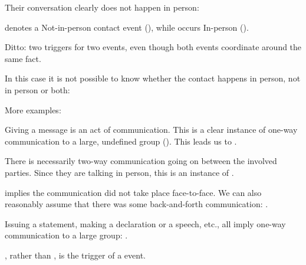 \begin{exe}

    \ex {} 
    \expl Their conversation clearly does not happen in person: 
    
    \ex {} 
    \expl {} denotes a Not-in-person contact event (), while  occurs In-person ().
    
    \ex {}
    \expl Ditto: two triggers for two events, even though both events coordinate around the same fact.
    
    \ex {} 
    \expl In this case it is not possible to know whether the contact happens in person, not in person or both: 
    
\end{exe}

More examples:

\begin{exe}
    
    \ex {}
    \expl Giving a message is an act of communication. This is a clear instance of one-way communication to a large, undefined group (). This leads us to .
    
    \ex {} 
    \expl There is necessarily two-way communication going on between the involved parties. Since they are talking in person, this is an instance of .
    
    \ex {} 
    \expl {} implies the communication did not take place face-to-face. We can also reasonably assume that there was some back-and-forth communication: .
    
    \ex {} 
    \expl Issuing a statement, making a declaration or a speech, etc., all imply one-way communication to a large group: .
    
    \ex {}
    \expl {}, rather than , is the trigger of a  event.
    
\end{exe}


